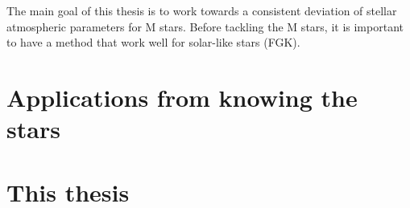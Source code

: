 The main goal of this thesis is to work towards a consistent deviation of stellar atmospheric
parameters for M stars. Before tackling the M stars, it is important to have a method that work
well for solar-like stars (FGK).



\section{Applications from knowing the stars}
\label{sec:stars_application}





\section{This thesis}
\label{sec:this_thesis}
